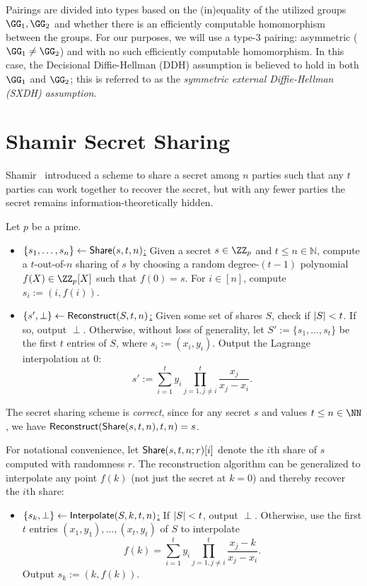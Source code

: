 Pairings are divided into types based on the (in)equality of the utilized groups $\GG_1,\GG_2$ and whether there is an efficiently computable homomorphism between the groups. For our purposes, we will use a type-3 pairing: asymmetric ($\GG_1 \neq \GG_2$) and with no such efficiently computable homomorphism. In this case, the Decisional Diffie-Hellman (DDH) assumption is believed to hold in both $\GG_1$ and $\GG_2$; this is referred to as the \emph{symmetric external Diffie-Hellman (SXDH) assumption}.

\section{Shamir Secret Sharing}\label{sec:shamir}
Shamir~\cite{CACM:Shamir79} introduced a scheme to share a secret among $n$ parties such that any $t$ parties can work together to recover the secret, but with any fewer parties the secret remains information-theoretically hidden.

\begin{construction}
Let $p$ be a prime.
    \begin{itemize}
        \item \underline{$\{s_1, \dots, s_n\} \gets \mathsf{Share}(s, t, n)$:} Given a secret $s \in \ZZ_p$ and $t \leq n \in \mathbb{N}$, compute a $t$-out-of-$n$ sharing of $s$ by choosing a random degree-$(t-1)$ polynomial $f(X) \in \ZZ_p[X]$ such that $f(0) = s$. For $i \in [n]$, compute $s_i := (i, f(i))$.
        \item \underline{$\{s', \perp\} \gets \mathsf{Reconstruct}(S, t, n)$:} Given some set of shares $S$, check if $\lvert S \rvert < t$. If so, output $\perp$. Otherwise, without loss of generality, let $S' := \{s_1, \dots, s_t\}$ be the first $t$ entries of $S$, where $s_i := (x_i, y_i)$. Output the Lagrange interpolation at 0:
        \[
            s' := \sum_{i=1}^t y_i \prod_{j=1, j \neq i}^t \frac{x_j}{x_j - x_i}.
        \]
    \end{itemize}
\end{construction}

The secret sharing scheme is \emph{correct}, since for any secret $s$ and values $t \leq n \in \NN$, we have $\mathsf{Reconstruct}(\mathsf{Share}(s, t, n),\allowbreak t, n) = s$. 

For notational convenience, let $\mathsf{Share}(s,t,n; r)[i]$ denote the $i$th share of $s$ computed with randomness $r$. The reconstruction algorithm can be generalized to interpolate any point $f(k)$ (not just the secret at $k=0$) and thereby recover the $i$th share:
\begin{itemize}
    \item \underline{$\{s_k,\perp\} \gets {\sf Interpolate}(S, k, t, n)$:} If $\lvert S \rvert < t$, output $\perp$. Otherwise, use the first $t$ entries $(x_1, y_1), \dots,\allowbreak (x_t, y_t)$ of $S$ to interpolate
    \[
        f(k) = \sum_{i=1}^t y_i \prod_{j=1, j \neq i}^t \frac{x_j - k}{x_j - x_i}.
    \]
    Output $s_k := (k, f(k))$.
\end{itemize}


